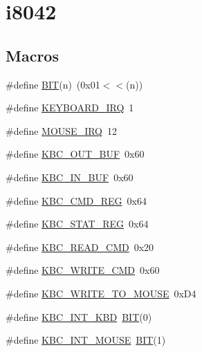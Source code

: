 \hypertarget{group__i8042}{}\section{i8042}
\label{group__i8042}
\subsection*{Macros}
\begin{DoxyCompactItemize}
\item 
\#define \mbox{\hyperlink{group__i8042_ga3a8ea58898cb58fc96013383d39f482c}{B\+IT}}(n)~(0x01$<$$<$(n))
\item 
\#define \mbox{\hyperlink{group__i8042_ga2d17911b50c0aeebb2e3325c5b36d4f2}{K\+E\+Y\+B\+O\+A\+R\+D\+\_\+\+I\+RQ}}~1
\item 
\#define \mbox{\hyperlink{group__i8042_ga85964cb90343bb1a029b1d1b4229f910}{M\+O\+U\+S\+E\+\_\+\+I\+RQ}}~12
\item 
\#define \mbox{\hyperlink{group__i8042_ga1ccde68b2b6d4e45b50eef1403e10bb7}{K\+B\+C\+\_\+\+O\+U\+T\+\_\+\+B\+UF}}~0x60
\item 
\#define \mbox{\hyperlink{group__i8042_gaac9289c99cf0a693a211da6d6cb1bb65}{K\+B\+C\+\_\+\+I\+N\+\_\+\+B\+UF}}~0x60
\item 
\#define \mbox{\hyperlink{group__i8042_ga6d57c7927a10f638c83046b52c8caac9}{K\+B\+C\+\_\+\+C\+M\+D\+\_\+\+R\+EG}}~0x64
\item 
\#define \mbox{\hyperlink{group__i8042_ga34b14687d83496940a236351fbbb1aea}{K\+B\+C\+\_\+\+S\+T\+A\+T\+\_\+\+R\+EG}}~0x64
\item 
\#define \mbox{\hyperlink{group__i8042_ga595a5cad2d3c793963da50865b2c1b47}{K\+B\+C\+\_\+\+R\+E\+A\+D\+\_\+\+C\+MD}}~0x20
\item 
\#define \mbox{\hyperlink{group__i8042_gaaa62a6987753a109d2f7a609ce8b7334}{K\+B\+C\+\_\+\+W\+R\+I\+T\+E\+\_\+\+C\+MD}}~0x60
\item 
\#define \mbox{\hyperlink{group__i8042_ga1747d582dc5a6d634f05016ece9625d8}{K\+B\+C\+\_\+\+W\+R\+I\+T\+E\+\_\+\+T\+O\+\_\+\+M\+O\+U\+SE}}~0x\+D4
\item 
\#define \mbox{\hyperlink{group__i8042_ga1f254ec35beb82e0082063362225705b}{K\+B\+C\+\_\+\+I\+N\+T\+\_\+\+K\+BD}}~\mbox{\hyperlink{group__uart_ga3a8ea58898cb58fc96013383d39f482c}{B\+IT}}(0)
\item 
\#define \mbox{\hyperlink{group__i8042_ga55c29ca646a573c228dde19dee9c2476}{K\+B\+C\+\_\+\+I\+N\+T\+\_\+\+M\+O\+U\+SE}}~\mbox{\hyperlink{group__uart_ga3a8ea58898cb58fc96013383d39f482c}{B\+IT}}(1)
$$
\end{DoxyCompactItemize}
